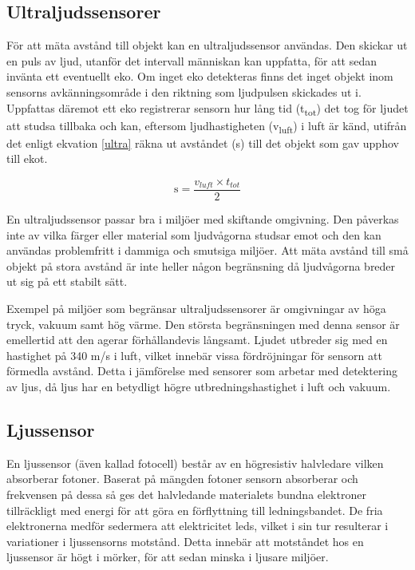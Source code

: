 \documentclass[11pt]{article}
\begin{document}
\begin{flushleft}
\subsection{Ultraljudssensorer}
För att mäta avstånd till objekt kan en ultraljudssensor användas. Den skickar ut en puls av ljud, utanför det intervall människan kan uppfatta, för att sedan invänta ett eventuellt eko. Om inget eko detekteras finns det inget objekt inom sensorns avkänningsområde i den riktning som ljudpulsen skickades ut i. Uppfattas däremot ett eko registrerar sensorn hur lång tid (\texorpdfstring{t\textsubscript{tot}}{t tot}) det tog för ljudet att studsa tillbaka och kan, eftersom ljudhastigheten (\texorpdfstring{v\textsubscript{luft}}{v luft}) i luft är känd, utifrån det enligt ekvation \ref{ultra} räkna ut avståndet (s) till det objekt som gav upphov till ekot. \cite{Ultraljud}

\begin{equation}\label{ultra}
	\textrm{s} = \dfrac{v_{luft} \times t_{tot}}2				
\end{equation}

En ultraljudssensor passar bra i miljöer med skiftande omgivning. Den påverkas inte av vilka färger eller material som ljudvågorna studsar emot och den kan användas problemfritt i dammiga och smutsiga miljöer. Att mäta avstånd till små objekt på stora avstånd är inte heller någon begränsning då ljudvågorna breder ut sig på ett stabilt sätt. \cite{Ultraljud}

Exempel på miljöer som begränsar ultraljudssensorer är omgivningar av höga tryck, vakuum samt hög värme. Den största begränsningen med denna sensor är emellertid att den agerar förhållandevis långsamt. Ljudet utbreder sig med en hastighet på 340 m/s i luft, vilket innebär vissa fördröjningar för sensorn att förmedla avstånd. Detta i jämförelse med sensorer som arbetar med detektering av ljus, då ljus har en betydligt högre utbredningshastighet i luft och vakuum. \cite{Ultraljud}

\subsection{Ljussensor}
En ljussensor (även kallad fotocell) består av en högresistiv halvledare vilken absorberar fotoner. Baserat på mängden fotoner sensorn absorberar och frekvensen på dessa så ges det halvledande materialets bundna elektroner tillräckligt med energi för att göra en förflyttning till ledningsbandet. De fria elektronerna medför sedermera att elektricitet leds,  vilket i sin tur resulterar i variationer i ljussensorns motstånd. Detta innebär att motståndet hos en ljussensor är högt i mörker, för att sedan minska i ljusare miljöer. \cite{612896}


\end{flushleft}
\end{document}
